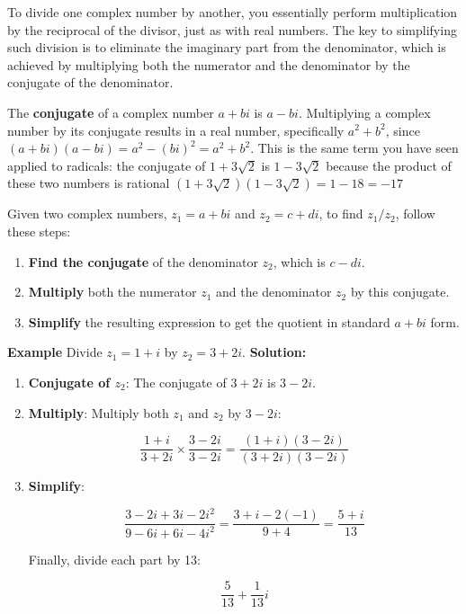 \documentclass[
]{article}
\providecommand{\tightlist}{%
  \setlength{\itemsep}{0pt}\setlength{\parskip}{0pt}}
\def\tightlist{}
\begin{document}
To divide one complex number by another, you essentially perform
multiplication by the reciprocal of the divisor, just as with real
numbers. The key to simplifying such division is to eliminate the
imaginary part from the denominator, which is achieved by multiplying
both the numerator and the denominator by the conjugate of the
denominator.

The \textbf{conjugate} of a complex number \(a + bi\) is \(a - bi\).
Multiplying a complex number by its conjugate results in a real number,
specifically \(a^2 + b^2\), since
\((a + bi)(a - bi) = a^2 - (bi)^2 = a^2 + b^2\). This is the same term
you have seen applied to radicals: the conjugate of \(1+3\sqrt2\) is
\(1-3\sqrt2\) because the product of these two numbers is rational
\((1+3\sqrt2)(1-3\sqrt2) = 1-18 = -17\)

Given two complex numbers, \(z_1 = a + bi\) and \(z_2 = c + di\), to
find \(z_1 / z_2\), follow these steps:

\begin{enumerate}
\def\labelenumi{\arabic{enumi}.}
\tightlist
\item
  \textbf{Find the conjugate} of the denominator \(z_2\), which is
  \(c - di\).
\item
  \textbf{Multiply} both the numerator \(z_1\) and the denominator
  \(z_2\) by this conjugate.
\item
  \textbf{Simplify} the resulting expression to get the quotient in
  standard \(a + bi\) form.
\end{enumerate}

\textbf{Example} Divide \(z_1 = 1 + i\) by \(z_2 = 3 + 2i\).
\textbf{Solution:}

\begin{enumerate}
\def\labelenumi{\arabic{enumi}.}
\item
  \textbf{Conjugate of \(z_2\)}: The conjugate of \(3 + 2i\) is
  \(3 - 2i\).
\item
  \textbf{Multiply}: Multiply both \(z_1\) and \(z_2\) by \(3 - 2i\):

  \[
  \frac{1 + i}{3 + 2i} \times \frac{3 - 2i}{3 - 2i} = \frac{(1 + i)(3 - 2i)}{(3 + 2i)(3 - 2i)}
  \]
\item
  \textbf{Simplify}:

  \[
  \frac{3 - 2i + 3i - 2i^2}{9 - 6i + 6i - 4i^2} = \frac{3 + i - 2(-1)}{9 + 4} = \frac{5 + i}{13}
  \]

  Finally, divide each part by 13:

  \[
  \frac{5}{13} + \frac{1}{13}i
  \]
\end{enumerate}
\end{document}
